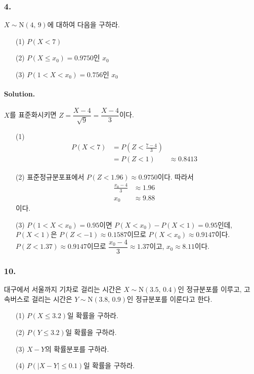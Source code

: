 \subsubsection{4.} $X\sim\mathrm{N}\left(4,\,9\right)$에 대하여 다음을 구하라.

\begin{itemize}
	\item [(1)] $P\left(X<7\right)$
	\item [(2)] $P\left(X\leq x_0\right)=0.9750$인 $x_0$
	\item [(3)] $P\left(1<X<x_0\right)=0.756$인 $x_0$
\end{itemize}

\paragraph{Solution.} $X$를 표준화시키면 $Z = \dfrac{X - 4}{\sqrt{9}} = \dfrac{X - 4}{3}$이다.

\begin{itemize}
	\item [(1)] {
		\begin{align*}
			P\left(X<7\right) &= P\left(Z<\frac{7-4}{3}\right) \\
			&= P\left(Z<1\right)
			&\approx 0.8413
		\end{align*}
	}
	\item [(2)] {
		표준정규분포표에서 $P\left(Z<1.96\right)\approx 0.9750$이다. 따라서
		\begin{align*}
			\frac{x_0-4}{3} &\approx 1.96 \\
			x_0 &\approx 9.88
		\end{align*}
		이다.
	}
	\item [(3)] {
		$P\left(1<X<x_0\right)=0.95$이면 $P\left(X<x_0\right) - P\left(X<1\right)=0.95$인데,
		$P\left(X<1\right)$은 $P\left(Z<-1\right) \approx 0.1587$이므로 $P\left(X<x_0\right) \approx 0.9147$이다.
		$P\left(Z<1.37\right) \approx 0.9147$이므로 $\dfrac{x_0-4}{3} \approx 1.37$이고, $x_0 \approx 8.11$이다.
	}
\end{itemize}

\subsubsection{10.} 대구에서 서울까지 기차로 걸리는 시간은 $X\sim\mathrm{N}\left(3.5,\,0.4\right)$인 정규분포를 이루고, 고속버스로 걸리는 시간은
$Y\sim\mathrm{N}\left(3.8,\,0.9\right)$인 정규분포를 이룬다고 한다.

\begin{itemize}
	\item [(1)] $P\left(X\leq3.2\right)$일 확률을 구하라.
	\item [(2)] $P\left(Y\leq3.2\right)$일 확률을 구하라.
	\item [(3)] $X-Y$의 확률분포를 구하라.
	\item [(4)] $P\left(\left|X-Y\right|\leq0.1\right)$일 확률을 구하라.
\end{itemize}


